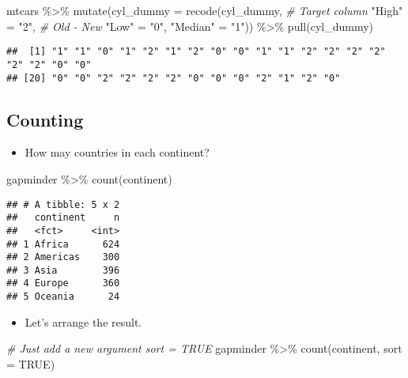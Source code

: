 \documentclass[
]{book}
\newenvironment{Shaded}{\begin{snugshade}}{\end{snugshade}}
\newcommand{\AttributeTok}[1]{\textcolor[rgb]{0.77,0.63,0.00}{#1}}
\newcommand{\CommentTok}[1]{\textcolor[rgb]{0.56,0.35,0.01}{\textit{#1}}}
\newcommand{\ConstantTok}[1]{\textcolor[rgb]{0.00,0.00,0.00}{#1}}
\newcommand{\FunctionTok}[1]{\textcolor[rgb]{0.00,0.00,0.00}{#1}}
\newcommand{\NormalTok}[1]{#1}
\newcommand{\OtherTok}[1]{\textcolor[rgb]{0.56,0.35,0.01}{#1}}
\newcommand{\SpecialCharTok}[1]{\textcolor[rgb]{0.00,0.00,0.00}{#1}}
\newcommand{\StringTok}[1]{\textcolor[rgb]{0.31,0.60,0.02}{#1}}
\providecommand{\tightlist}{%
  \setlength{\itemsep}{0pt}\setlength{\parskip}{0pt}}
\begin{document}
\begin{Shaded}
\begin{Highlighting}[]
\NormalTok{mtcars }\SpecialCharTok{\%\textgreater{}\%}
  \FunctionTok{mutate}\NormalTok{(}\AttributeTok{cyl\_dummy =} \FunctionTok{recode}\NormalTok{(cyl\_dummy, }\CommentTok{\# Target column }
                            \StringTok{"High"} \OtherTok{=} \StringTok{"2"}\NormalTok{, }\CommentTok{\# Old {-} New}
                            \StringTok{"Low"} \OtherTok{=} \StringTok{"0"}\NormalTok{,}
                            \StringTok{"Median"} \OtherTok{=} \StringTok{"1"}\NormalTok{)) }\SpecialCharTok{\%\textgreater{}\%}
  \FunctionTok{pull}\NormalTok{(cyl\_dummy)}
\end{Highlighting}
\end{Shaded}

\begin{verbatim}
##  [1] "1" "1" "0" "1" "2" "1" "2" "0" "0" "1" "1" "2" "2" "2" "2" "2" "2" "0" "0"
## [20] "0" "0" "2" "2" "2" "2" "0" "0" "0" "2" "1" "2" "0"
\end{verbatim}

\hypertarget{counting}{%
\subsection{Counting}\label{counting}}

\begin{itemize}
\tightlist
\item
  How may countries in each continent?
\end{itemize}

\begin{Shaded}
\begin{Highlighting}[]
\NormalTok{gapminder }\SpecialCharTok{\%\textgreater{}\%}
  \FunctionTok{count}\NormalTok{(continent)}
\end{Highlighting}
\end{Shaded}

\begin{verbatim}
## # A tibble: 5 x 2
##   continent     n
##   <fct>     <int>
## 1 Africa      624
## 2 Americas    300
## 3 Asia        396
## 4 Europe      360
## 5 Oceania      24
\end{verbatim}

\begin{itemize}
\tightlist
\item
  Let's arrange the result.
\end{itemize}

\begin{Shaded}
\begin{Highlighting}[]
\CommentTok{\# Just add a new argument \textasciigrave{}sort = TRUE\textasciigrave{}}
\NormalTok{gapminder }\SpecialCharTok{\%\textgreater{}\%}
  \FunctionTok{count}\NormalTok{(continent, }\AttributeTok{sort =} \ConstantTok{TRUE}\NormalTok{)}
\end{Highlighting}
\end{Shaded}
\end{document}
